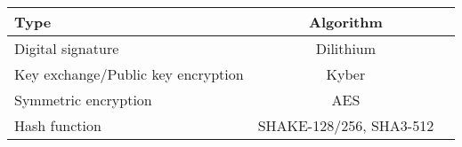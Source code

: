 \begin{tabular}{|l|c|c|}
  \hline
  Type                               & Algorithm               \\
  \hline
  Digital signature                  & Dilithium               \\
  Key exchange/Public key encryption & Kyber                   \\
  Symmetric encryption               & AES                     \\
  Hash function                      & SHAKE-128/256, SHA3-512 \\
  \hline
\end{tabular}